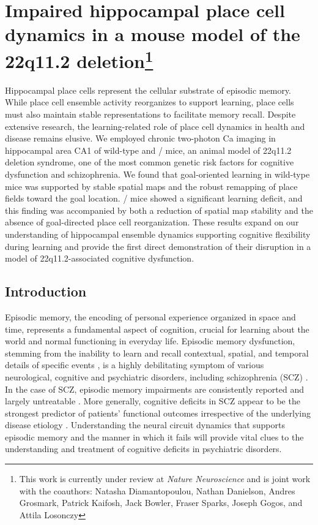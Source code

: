 \acresetall
\newcommand{\Aprime}{}
\def\Aprime/{Context~A\super{$\prime$}}
\newcommand{\A}{}
\def\A/{Context~A}

\chapter[Impaired hippocampal place cell dynamics in a mouse model of the 22q11.2 deletion]{Impaired hippocampal place cell dynamics in a mouse model of the 22q11.2 deletion\footnote{This work is currently under review at \emph{Nature Neuroscience} and is joint work with the coauthors: Natasha Diamantopoulou, Nathan Danielson, Andres Grosmark, Patrick Kaifosh, Jack
Bowler, Fraser Sparks, Joseph Gogos, and Attila Losonczy}}
\label{ch:df}

Hippocampal place cells represent the cellular substrate of episodic memory. While place cell ensemble activity reorganizes to support learning, place cells must also maintain stable representations to facilitate memory recall. Despite extensive research, the learning-related role of place cell dynamics in health and disease remains elusive. We employed chronic two-photon Ca imaging in hippocampal area CA1 of wild-type and \df/ mice, an animal model of 22q11.2 deletion syndrome, one of the most common genetic risk factors for cognitive dysfunction and schizophrenia. We found that goal-oriented learning in wild-type mice was supported by stable spatial maps and the robust remapping of place fields toward the goal location. \df/ mice showed a significant learning deficit, and this finding was accompanied by both a reduction of spatial map stability and the absence of goal-directed place cell reorganization. These results expand on our understanding of hippocampal ensemble dynamics supporting cognitive flexibility during learning and provide the first direct demonstration of their disruption in a model of 22q11.2-associated cognitive dysfunction.

\section{Introduction}

Episodic memory, the encoding of personal experience organized in space and time, represents a fundamental aspect of cognition, crucial for learning about the world and normal functioning in everyday life. Episodic memory dysfunction, stemming from the inability to learn and recall contextual, spatial, and temporal details of specific events \citep{Dickerson2010, Eichenbaum2000}, is a highly debilitating symptom of various neurological, cognitive and psychiatric disorders, including schizophrenia (SCZ) \citep{Dere2010, Leavitt2009}. In the case of SCZ, episodic memory impairments are consistently reported \citep{Aleman1999, Schaefer2013} and largely untreatable \citep{Green1996, Ibrahim2011, Keefe2007}. More generally, cognitive deficits in SCZ appear to be the strongest predictor of patients' functional outcomes irrespective of the underlying disease etiology \citep{Green1996, Ranganath2008}. Understanding the neural circuit dynamics that supports episodic memory and the manner in which it fails will provide vital clues to the understanding and treatment of cognitive deficits in psychiatric disorders.

